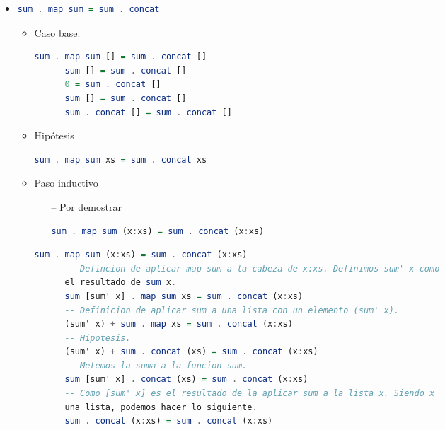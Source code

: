 \documentclass[spanish,12pt,letterpaper]{article}
\begin{document}
\begin{itemize}
\item
  \begin{lstlisting}[language=Haskell]
    sum . map sum = sum . concat
  \end{lstlisting}
  \begin{itemize}
    \item Caso base:
    \begin{lstlisting}[language=Haskell]
      sum . map sum [] = sum . concat []
      sum [] = sum . concat []
      0 = sum . concat []
      sum [] = sum . concat []
      sum . concat [] = sum . concat []
    \end{lstlisting}
  \item Hipótesis
    \begin{lstlisting}[language=Haskell]
      sum . map sum xs = sum . concat xs
    \end{lstlisting}
  \item Paso inductivo
    \begin{itemize}
    \item [--] Por demostrar
      \begin{lstlisting}[language=Haskell]
        sum . map sum (x:xs) = sum . concat (x:xs)
      \end{lstlisting}
    \end{itemize}
    \begin{lstlisting}[language=Haskell]
      sum . map sum (x:xs) = sum . concat (x:xs)
      -- Defincion de aplicar map sum a la cabeza de x:xs. Definimos sum' x como
      el resultado de sum x.
      sum [sum' x] . map sum xs = sum . concat (x:xs)
      -- Definicion de aplicar sum a una lista con un elemento (sum' x).
      (sum' x) + sum . map xs = sum . concat (x:xs)
      -- Hipotesis.
      (sum' x) + sum . concat (xs) = sum . concat (x:xs)
      -- Metemos la suma a la funcion sum.
      sum [sum' x] . concat (xs) = sum . concat (x:xs)
      -- Como [sum' x] es el resultado de la aplicar sum a la lista x. Siendo x
      una lista, podemos hacer lo siguiente.
      sum . concat (x:xs) = sum . concat (x:xs)
    \end{lstlisting}
  \end{itemize}


\end{itemize}
\end{document}
